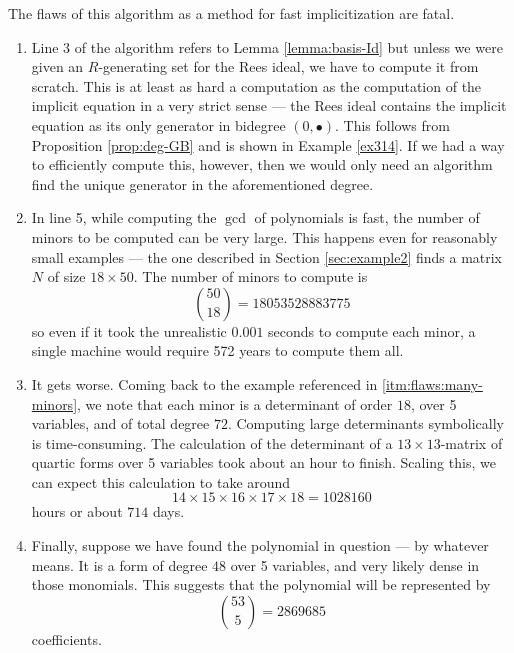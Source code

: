 \documentclass[fleqn,reqno]{amsart}
\numberwithin{first}{chapter}
\begin{document}
\begin{paragraf}
\label{par:flaws}
The flaws of this algorithm as a method for fast implicitization are fatal.
\begin{enumerate}
\item
\label{itm:flaws:GB}
Line 3 of the algorithm refers to Lemma \ref{lemma:basis-Id} but unless we were given
an $R$-generating set for the Rees ideal,
we have to compute it from scratch.
This is at least as hard a computation as the computation of the implicit equation
in a very strict sense ---
the Rees ideal contains the implicit equation as its only generator in bidegree $(0,\bullet)$.
This follows from Proposition \ref{prop:deg-GB} and is shown in Example \ref{ex314}.
If we had a way to efficiently compute this, however,
then we would only need an algorithm find the unique generator in the aforementioned degree.

\item
\label{itm:flaws:many-minors}
In line 5, while computing the $\gcd$ of polynomials is fast,
the number of minors to be computed can be very large.
This happens even for reasonably small examples ---
the one described in Section \ref{sec:example2} finds a matrix $N$ of size $18\times50$.
The number of minors to compute is
\[
	\binom{50}{18}=18053528883775
\]
so even if it took the unrealistic $0.001$ seconds to compute each minor,
a single machine would require 572 years to compute them all.

\item
\label{itm:flaws:large-det}
It gets worse.
Coming back to the example referenced in \ref{itm:flaws:many-minors},
we note that each minor is a determinant of order $18$, over 5 variables,
and of total degree $72$.
Computing large determinants symbolically is time-consuming.
The calculation of the determinant of a $13\times13$-matrix of quartic forms
over 5 variables took about an hour to finish.
Scaling this, we can expect this calculation to take around
\[
	14\times15\times16\times17\times18=1028160
\]
hours or about $714$ days.

\item
\label{itm:flaws:large-poly}
Finally, suppose we have found the polynomial in question --- by whatever means.
It is a form of degree $48$ over 5 variables, and very likely dense in those monomials.
This suggests that the polynomial will be represented by
\[
	\binom{53}{5}=2869685
\]
coefficients.
\end{enumerate}
\end{paragraf}
\end{document}
